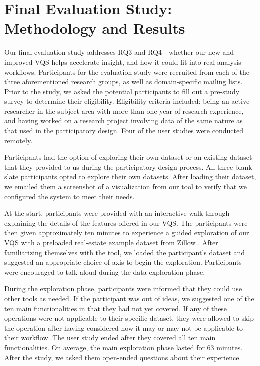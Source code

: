 \section{Final Evaluation Study: Methodology and Results} \label{evaluation}
\par Our final evaluation study addresses RQ3 and RQ4---whether our new and improved VQS helps accelerate insight, and how it could fit into real analysis workflows. Participants for the evaluation study were recruited from each of the three aforementioned research groups, as well as domain-specific mailing lists. Prior to the study, we asked the potential participants to fill out a pre-study survey to determine their eligibility. Eligibility criteria included: being an active researcher in the subject area with more than one year of research experience, and having worked on a research project involving data of the same nature as that used in the participatory design. Four of the user studies were conducted remotely.  
\par Participants had the option of exploring their own dataset or an existing dataset that they provided to us during the participatory design process. All three blank-slate participants opted to explore their own datasets. After loading their dataset, we emailed them a screenshot of a visualization from our tool to verify that we configured the system to meet their needs. 
\par At the start, participants were provided with an interactive walk-through explaining the details of the features offered in our VQS. The participants were then given approximately ten minutes to experience a guided exploration of our VQS with a preloaded real-estate example dataset from Zillow \cite{zillow}. After familiarizing themselves with the tool, we loaded the participant's dataset and suggested an appropriate choice of axis to begin the exploration. Participants were encouraged to talk-aloud during the data exploration phase.
\par During the exploration phase, participants were informed that they could use other tools as needed. If the participant was out of ideas, we suggested one of the ten main functionalities in \zv {}that they had not yet covered. If any of these operations were not applicable to their specific dataset, they were allowed to skip the operation after having considered how it may or may not be applicable to their workflow. The user study ended after they covered all ten main functionalities. On average, the main exploration phase lasted for 63 minutes. After the study, we asked them open-ended questions about their experience. 
